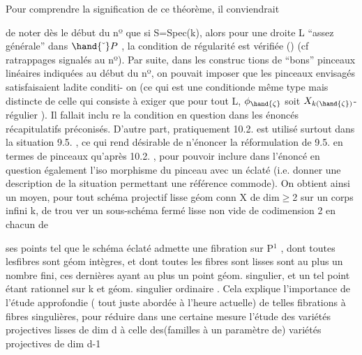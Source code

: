 
Pour comprendre la signification de ce théorème, il conviendrait

de noter dès le début du nº \hand{(}que  si S=Spec(k)\hand{)}, alors pour une droite
L ``assez générale'' dans $\hand{\check{\ }}P$ ,  la condition de régularité est vérifiée ()
(cf ratrappages signalés au  nº).  Par suite, dans les construc%
tions de ``bons'' pinceaux linéaires  indiquées au début du nº, on pouvait
imposer que les pinceaux envisagés  satisfaisaient ladite conditi-
on  (ce qui  est une conditionde même type mais\hand{,} distincte de celle qui consiste à
exiger que pour tout \hand{$\zeta\in$}L,  $\phi_{\hand{\zeta}}$  soit $X_{k(\hand{\zeta})}$-régulier ). Il fallait inclu
re la condition en question dans les énoncés récapitulatifs préconisés.
  D'autre part, pratiquement  10.2. est
utilisé surtout dans la situation 9.5. ,  ce qui  rend  désirable de
n'énoncer la réformulation de  9.5.  en termes de pinceaux qu'après
10.2. , pour pouvoir  inclure dans l'énoncé en question  également l'iso
morphisme du pinceau avec un éclaté (i.e. donner une description de la
situation  permettant une référence commode).  On obtient ainsi un
moyen, pour tout schéma projectif lisse \hand{(}géom  conn  X  de dim$\geq$2 \hand{)}sur un corps infini k,  de trou
ver un sous-schéma fermé lisse non vide de codimension 2 en chacun de

ses points 
 tel que le schéma éclaté admette une fibration
sur P$^1$ , dont toutes les\hand{/}fibres \hand{(}sont géom intègres, et  dont toutes les fibres \hand{)}sont lisses sont au plus un nombre fini,
ces dernières ayant au plus un point  géom. singulier, et
un tel point  étant rationnel sur k et géom. singulier ordinaire .  Cela
explique l'importance  de l'étude approfondie ( tout juste abordée à l'heure
actuelle) de telles fibrations à fibres singulières, pour réduire dans 
une certaine mesure l'étude des variétés projectives lisses de dim d
à celle des(familles à un paramètre de) variétés projectives de dim d-1\hand{,}

